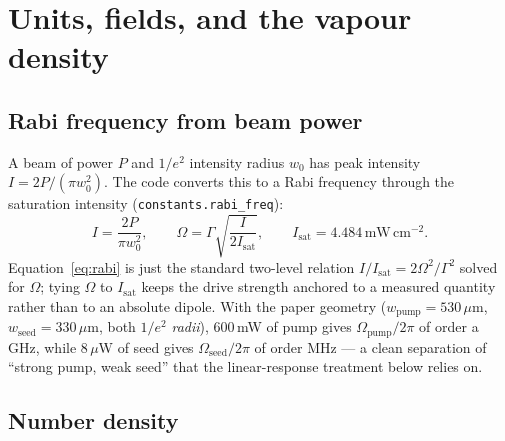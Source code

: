 \documentclass[11pt]{article}
\newcommand{\code}[1]{\texttt{#1}}
\begin{document}
\section{Units, fields, and the vapour density}

\subsection{Rabi frequency from beam power}

A beam of power $P$ and $1/e^2$ intensity radius $w_0$ has peak intensity
$I=2P/(\pi w_0^2)$. The code converts this to a Rabi frequency through the
saturation intensity (\code{constants.rabi\_freq}):
\begin{equation}
I=\frac{2P}{\pi w_0^2},
\qquad
\Omega=\Gamma\sqrt{\frac{I}{2 I_{\mathrm{sat}}}},
\qquad I_{\mathrm{sat}}=4.484\,\mathrm{mW\,cm^{-2}}.
\label{eq:rabi}
\end{equation}
Equation~\eqref{eq:rabi} is just the standard two-level relation
$I/I_{\mathrm{sat}}=2\Omega^2/\Gamma^2$ solved for $\Omega$; tying $\Omega$ to
$I_{\mathrm{sat}}$ keeps the drive strength anchored to a measured quantity rather
than to an absolute dipole. With the paper geometry
($w_{\text{pump}}=530\,\mu$m, $w_{\text{seed}}=330\,\mu$m, both $1/e^2$
\emph{radii}), $600\,$mW of pump gives $\Omega_{\text{pump}}/2\pi$ of order a
GHz, while $8\,\mu$W of seed gives $\Omega_{\text{seed}}/2\pi$ of order MHz --- a
clean separation of ``strong pump, weak seed'' that the linear-response treatment
below relies on.

\subsection{Number density}
\end{document}
